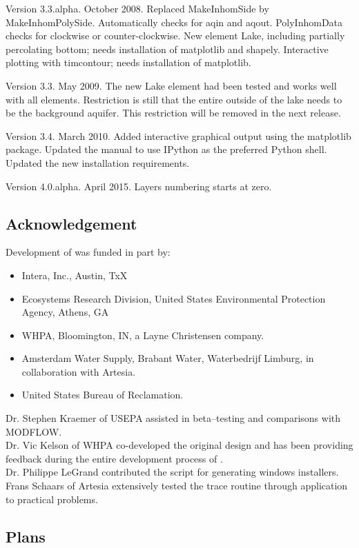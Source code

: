 \documentclass [10pt,letterpaper] {article}
\begin{document}
\begin{description}
\item Version 3.3.alpha. October 2008. Replaced MakeInhomSide by MakeInhomPolySide. Automatically checks for aqin and aqout. PolyInhomData checks for clockwise or counter-clockwise. New element Lake, including partially percolating bottom; needs installation of matplotlib and shapely. Interactive plotting with timcontour; needs installation of matplotlib.
\item Version 3.3. May 2009. The new Lake element had been tested and works well with all elements. Restriction is still that the entire outside of the lake needs to be the background aquifer. This restriction will be removed in the next release.
\item Version 3.4. March 2010. Added interactive graphical output using the matplotlib package. Updated the manual to use IPython as the preferred Python shell. Updated the new installation requirements.
\item Version 4.0.alpha. April 2015. Layers numbering starts at zero.
\end{description}

\subsection{Acknowledgement}
Development of \Timsp was funded in part by:
\begin{itemize}
\item Intera, Inc., Austin, TxX
\item  Ecosystems
Research Division, United States
Environmental Protection Agency, Athens, GA
\item WHPA, Bloomington, IN, a Layne Christensen company.
\item Amsterdam Water Supply, Brabant Water, Waterbedrijf Limburg, in
collaboration with Artesia.
\item United States Bureau of Reclamation.
\end{itemize}
Dr. Stephen Kraemer of USEPA assisted in
beta--testing and comparisons with MODFLOW.
\\Dr. Vic Kelson of WHPA co-developed the original design and has been providing feedback during
the entire development process of \Tim.
\\Dr. Philippe LeGrand contributed the script for generating windows
installers.
\\Frans Schaars of Artesia extensively tested the trace routine through application to practical problems.
\subsection{Plans}
\end{document}

